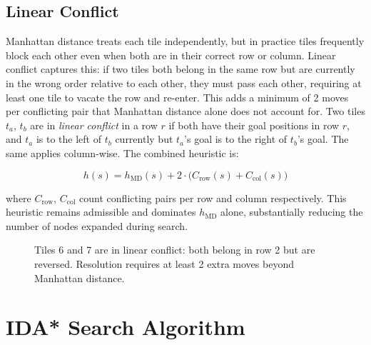 \documentclass[11pt]{article}
\begin{document}
	\subsection{Linear Conflict}
	
	Manhattan distance treats each tile independently, but in practice tiles 
	frequently block each other even when both are in their correct row or column. 
	Linear conflict captures this: if two tiles both belong in the same row but 
	are currently in the wrong order relative to each other, they must pass each 
	other, requiring at least one tile to vacate the row and re-enter. This adds a 
	minimum of 2 moves per conflicting pair that Manhattan distance alone does not 
	account for. Two tiles $t_a$, $t_b$ are in \textit{linear conflict} in a row 
	$r$ if both have their goal positions in row $r$, and $t_a$ is to the left of 
	$t_b$ currently but $t_a$'s goal is to the right of $t_b$'s goal. The same 
	applies column-wise. The combined heuristic is:
	
	\[
	h(s) = h_{\text{MD}}(s) + 2 \cdot \bigl(C_{\text{row}}(s) + C_{\text{col}}(s)\bigr)
	\]
	
	where $C_{\text{row}}$, $C_{\text{col}}$ count conflicting pairs per row and 
	column respectively. This heuristic remains admissible and dominates 
	$h_{\text{MD}}$ alone, substantially reducing the number of nodes expanded 
	during search.
	
	\begin{figure}[H]
		\centering
		\caption{Tiles 6 and 7 are in linear conflict: both belong in row 2 but are 
			reversed. Resolution requires at least 2 extra moves beyond Manhattan distance.}
	\end{figure}
	
	\section{IDA* Search Algorithm}
	
\end{document}
